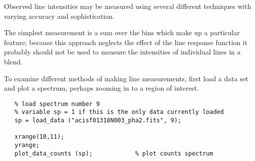\documentclass{book}
\begin{document}
Observed line intensities may be measured using several different
techniques with varying accuracy and sophistication.

The simplest measurement is a sum over the bins which make up a particular
feature; because this approach neglects the effect of the line response
function it probably should not be used to measure the intensities of
individual lines in a blend.

To examine different methods of making line measurements, first load
a data set and plot a spectrum, perhaps zooming in to a region of interest.

 \begin{verbatim}
   % load spectrum number 9
   % variable sp = 1 if this is the only data currently loaded
   sp = load_data ("acisf01318N003_pha2.fits", 9);

   xrange(10,11);
   yrange;
   plot_data_counts (sp);            % plot counts spectrum
 \end{verbatim}
\end{document}
